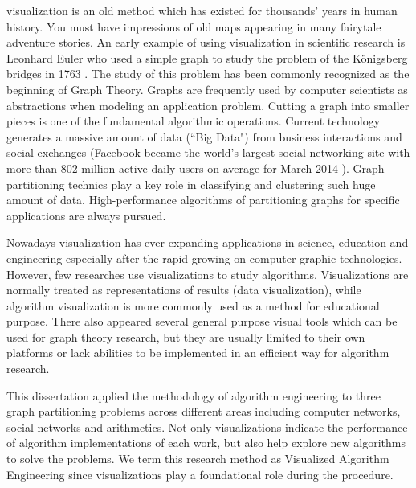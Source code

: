 
visualization is an old method which has existed for thousands' years in human history.  You must have impressions of old maps appearing in many fairytale adventure stories. An early example of using visualization in scientific research is Leonhard Euler who used a simple graph to study the problem of the Königsberg bridges in 1763 \cite{biggs1986graph}. The study of this problem has been commonly recognized as the beginning of Graph Theory. Graphs are frequently used by computer scientists as abstractions when modeling an application problem. Cutting a graph into smaller pieces is one of the fundamental algorithmic operations. Current technology generates a massive amount of data (``Big Data") from business interactions and social exchanges (Facebook became the world's largest social networking site with more than 802 million active daily users on average for March 2014 \cite{bright2015too}). Graph partitioning technics play a key role in classifying and clustering such huge amount of data. High-performance algorithms of partitioning graphs for specific applications are always pursued.

Nowadays visualization has ever-expanding applications in science, education and engineering especially after the rapid growing on computer graphic technologies. However, few researches use visualizations to study algorithms. Visualizations are normally treated as representations of results (data visualization), while algorithm visualization is more commonly used as a method for educational purpose. There also appeared several general purpose visual tools which can be used for graph theory research, but they are usually limited to their own platforms or lack abilities to be implemented in an efficient way for algorithm research.
 
This dissertation applied the methodology of algorithm engineering to three graph partitioning problems across different areas including computer networks, social networks and arithmetics.  Not only visualizations indicate the performance of algorithm implementations of each work, but also help explore new algorithms to solve the problems. We term this research method as Visualized Algorithm Engineering since visualizations play a foundational role during the procedure.